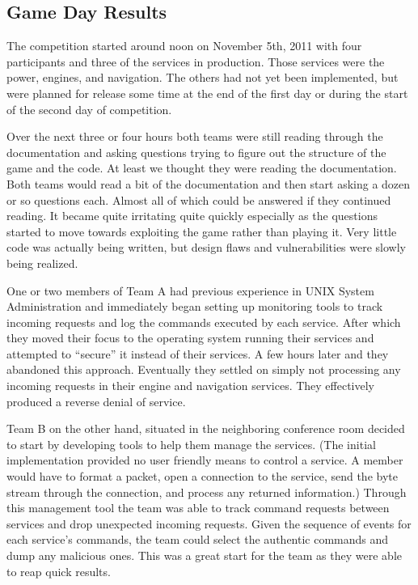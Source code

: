 \documentclass[10pt]{article}
\begin{document}
\subsection{Game Day Results}
The competition started around noon on November 5th, 2011 with four participants
and three of the services in production. Those services were the power, engines,
and navigation. The others had not yet been implemented, but were planned for
release some time at the end of the first day or during the start of the second
day of competition.

Over the next three or four hours both teams were still reading through the
documentation and asking questions trying to figure out the structure of the
game and the code. At least we thought they were reading the documentation.
Both teams would read a bit of the documentation and then start asking a
dozen or so questions each. Almost all of which could be answered if they
continued reading. It became quite irritating quite quickly especially as
the questions started to move towards exploiting the game rather than
playing it. Very little code was actually being written, but design flaws and
vulnerabilities were slowly being realized.

One or two members of Team A had previous experience in UNIX System
Administration and immediately began setting up monitoring tools to track
incoming requests and log the commands executed by each service. After which
they moved their focus to the operating system running their services and
attempted to ``secure'' it instead of their services. A few hours later and they
abandoned this approach. Eventually they settled on simply not processing any
incoming requests in their engine and navigation services. They effectively
produced a reverse denial of service.

Team B on the other hand, situated in the neighboring conference room decided to
start by developing tools to help them manage the services. (The initial
implementation provided no user friendly means to control a service. A member
would have to format a packet, open a connection to the service, send the
byte stream through the connection, and process any returned information.)
Through this management tool the team was able to track command requests between
services and drop unexpected incoming requests. Given the sequence of events for
each service's commands, the team could select the authentic commands and dump
any malicious ones. This was a great start for the team as they were able to
reap quick results.
\end{document}
